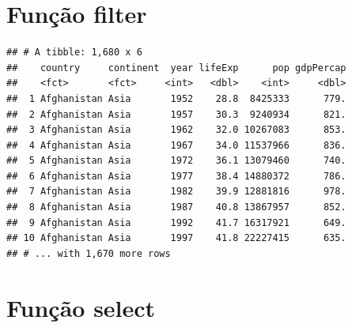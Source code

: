 \documentclass[
]{article}
\newenvironment{Shaded}{\begin{snugshade}}{\end{snugshade}}
\newcommand{\CommentTok}[1]{\textcolor[rgb]{0.56,0.35,0.01}{\textit{#1}}}
\newcommand{\KeywordTok}[1]{\textcolor[rgb]{0.13,0.29,0.53}{\textbf{#1}}}
\newcommand{\NormalTok}[1]{#1}
\newcommand{\OperatorTok}[1]{\textcolor[rgb]{0.81,0.36,0.00}{\textbf{#1}}}
\newcommand{\StringTok}[1]{\textcolor[rgb]{0.31,0.60,0.02}{#1}}
\begin{document}
\hypertarget{funuxe7uxe3o-filter-2}{%
\section{Função filter}\label{funuxe7uxe3o-filter-2}}

\begin{Shaded}
\end{Shaded}

\begin{verbatim}
## # A tibble: 1,680 x 6
##    country     continent  year lifeExp      pop gdpPercap
##    <fct>       <fct>     <int>   <dbl>    <int>     <dbl>
##  1 Afghanistan Asia       1952    28.8  8425333      779.
##  2 Afghanistan Asia       1957    30.3  9240934      821.
##  3 Afghanistan Asia       1962    32.0 10267083      853.
##  4 Afghanistan Asia       1967    34.0 11537966      836.
##  5 Afghanistan Asia       1972    36.1 13079460      740.
##  6 Afghanistan Asia       1977    38.4 14880372      786.
##  7 Afghanistan Asia       1982    39.9 12881816      978.
##  8 Afghanistan Asia       1987    40.8 13867957      852.
##  9 Afghanistan Asia       1992    41.7 16317921      649.
## 10 Afghanistan Asia       1997    41.8 22227415      635.
## # ... with 1,670 more rows
\end{verbatim}

\begin{Shaded}
\end{Shaded}

\hypertarget{funuxe7uxe3o-select}{%
\section{Função select}\label{funuxe7uxe3o-select}}

\begin{Shaded}
\end{Shaded}
\end{document}
